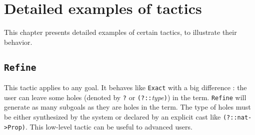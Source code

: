 \chapter{Detailed examples of tactics}
\label{Tactics-examples}

This chapter presents detailed examples of certain tactics, to
illustrate their behavior.

\section{\tt Refine}
\label{Refine-example}

This tactic applies to any goal. It behaves like {\tt Exact} with a
big difference : the user can leave some holes (denoted by \texttt{?} or 
{\tt (?::}{\it type}{\tt )}) in the term. 
{\tt Refine} will generate as many
subgoals as they are holes in the term. The type of holes must be
either synthesized by the system or declared by an
explicit cast like \verb|(?::nat->Prop)|. This low-level
tactic can be useful to advanced users.

\firstexample
\example{}

